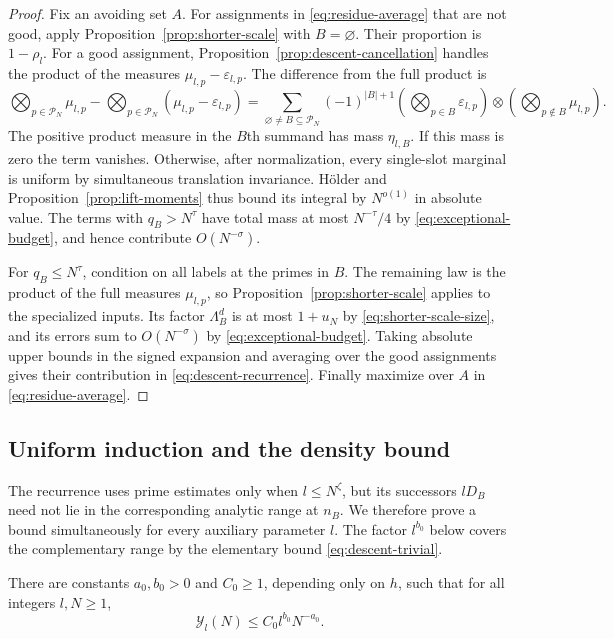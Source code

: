 \begin{proof}
Fix an avoiding set $A$.  For assignments in \eqref{eq:residue-average}
that are not good, apply Proposition~\ref{prop:shorter-scale} with
$B=\varnothing$.  Their proportion is $1-\rho_l$.
For a good assignment, Proposition~\ref{prop:descent-cancellation}
handles the product of the measures $\mu_{l,p}-\varepsilon_{l,p}$.
The difference from the full product is
\[
 \bigotimes_{p\in\mathcal P_N}\mu_{l,p}
 -\bigotimes_{p\in\mathcal P_N}(\mu_{l,p}-\varepsilon_{l,p})
 =\sum_{\varnothing\ne B\subseteq\mathcal P_N}(-1)^{|B|+1}
   \left(\bigotimes_{p\in B}\varepsilon_{l,p}\right)
   \otimes\left(\bigotimes_{p\notin B}\mu_{l,p}\right).
\]
The positive product measure in the $B$th summand has mass
$\eta_{l,B}$.  If this mass is zero the term vanishes.  Otherwise,
after normalization, every single-slot marginal is uniform by
simultaneous translation invariance.  H\"older and
Proposition~\ref{prop:lift-moments} thus bound its integral by
$N^{o(1)}$ in absolute value.  The terms with $q_B>N^\tau$ have total
mass at most $N^{-\tau}/4$ by \eqref{eq:exceptional-budget}, and hence
contribute $O(N^{-\sigma})$.

For $q_B\le N^\tau$, condition on all labels at the primes in $B$.
The remaining law is the product of the full measures $\mu_{l,p}$, so
Proposition~\ref{prop:shorter-scale} applies to the specialized inputs.
Its factor $\Lambda_B^d$ is at most $1+u_N$ by
\eqref{eq:shorter-scale-size}, and its errors sum to $O(N^{-\sigma})$
by \eqref{eq:exceptional-budget}.  Taking absolute upper bounds in the
signed expansion and averaging over the good assignments gives their
contribution in \eqref{eq:descent-recurrence}.  Finally maximize over
$A$ in \eqref{eq:residue-average}.
\end{proof}

\subsection{Uniform induction and the density bound}

The recurrence uses prime estimates only when $l\le N^\zeta$, but its
successors $lD_B$ need not lie in the corresponding analytic range at
$n_B$.  We therefore prove a bound simultaneously for every auxiliary
parameter $l$.  The factor $l^{b_0}$ below covers the complementary
range by the elementary bound \eqref{eq:descent-trivial}.

\begin{proposition}\label{prop:uniform-descent}
There are constants $a_0,b_0>0$ and $C_0\ge1$, depending only on $h$, such
that for all integers $l,N\ge1$,
\begin{equation}\label{eq:uniform-descent}
 \mathcal Y_l(N)\le C_0l^{b_0}N^{-a_0}.
\end{equation}
\end{proposition}

